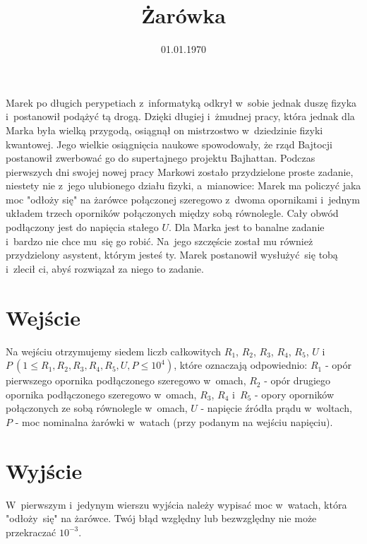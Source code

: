 \documentclass[zad]{soigstyl}
\date{01.01.1970}
\title{\mbox{Żarówka}}
\begin{document}
\begin{tasktext}%
    \noindent
    Marek po długich perypetiach z~informatyką odkrył w~sobie jednak duszę fizyka i~postanowił podążyć tą drogą. Dzięki długiej i~żmudnej pracy, która jednak dla Marka była wielką przygodą, osiągnął on mistrzostwo w~dziedzinie fizyki kwantowej. Jego wielkie osiągnięcia naukowe spowodowały, że rząd Bajtocji postanowił zwerbować go do supertajnego projektu Bajhattan. Podczas pierwszych dni swojej nowej pracy Markowi zostało przydzielone proste zadanie, niestety nie z~jego ulubionego działu fizyki, a~mianowice: Marek ma policzyć jaka moc "odłoży się" na żarówce połączonej szeregowo z~dwoma opornikami i~jednym układem trzech oporników połączonych między sobą równolegle. Cały obwód podłączony jest do napięcia stałego $U$. Dla Marka jest to banalne zadanie i~bardzo nie chce mu~się go robić. Na~jego szczęście został mu również przydzielony asystent, którym jesteś ty. Marek postanowił wysłużyć~się tobą i~zlecił ci, abyś rozwiązał za niego to zadanie. 
	
    	\section{Wejście}
	Na wejściu otrzymujemy siedem liczb całkowitych $R_1$, $R_2$, $R_3$, $R_4$, $R_5$, $U$ i~$P~(1 \leqslant R_1, R_2, R_3, R_4, R_5, U, P \leqslant 10^4)$, które oznaczają odpowiednio: $R_1$ - opór pierwszego opornika podłączonego szeregowo w~omach, $R_2$ - opór drugiego opornika podłączonego szeregowo w~omach, $R_3$, $R_4$ i~$R_5$ - opory oporników połączonych ze sobą równolegle w~omach, $U$ - napięcie źródła prądu w~woltach, $P$ - moc nominalna żarówki w~watach (przy podanym na wejściu napięciu).

	\section{Wyjście}
	W~pierwszym i~jedynym wierszu wyjścia należy wypisać moc w~watach, która "odłoży~się" na żarówce. Twój błąd względny lub bezwzględny nie może przekraczać $10^{-3}$.
	
	\oigprzyklady
\end{tasktext}
\end{document}
